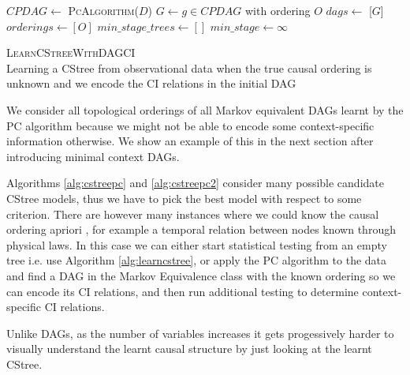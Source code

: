 \documentclass{tufte-book}
\begin{document}
\begin{algorithm}\label{alg:cstreepc2}
\SetAlgoLined
{}
$CPDAG \gets$ \textsc{PcAlgorithm}($D$)\;
{
$G \gets g \in CPDAG$ with ordering $O$\;
$dags \gets$ [$G$]\;
$orderings \gets [O]$\;
}
$min\_stage\_trees \gets []$\;
$min\_stage \gets \infty$\;
\caption{\textsc{LearnCStreeWithDAGCI} \\ Learning a CStree from observational data when the true causal ordering is unknown and we encode the CI relations in the initial DAG}

\end{algorithm}




We consider all topological orderings of all Markov equivalent DAGs learnt by the PC algorithm because we might not be able to encode some context-specific information otherwise. We show an example of this in the next section after introducing minimal context DAGs.

Algorithms \ref{alg:cstreepc} and \ref{alg:cstreepc2} consider many possible candidate CStree models, thus we have to pick the best model with respect to some criterion. There are however many instances where we could know the causal ordering apriori \cite{thwaites-2010-causal-analy,silander-2013}, for example a temporal relation between nodes known through physical laws. In this case we can either start statistical testing from an empty tree i.e. use Algorithm \ref{alg:learncstree}, or apply the PC algorithm to the data and find a DAG in the Markov Equivalence class with the known ordering so we can encode its CI relations, and then run additional testing to determine context-specific CI relations.



Unlike DAGs, as the number of variables increases it gets progessively harder to visually understand the learnt causal structure by just looking at the learnt CStree.
\end{document}
